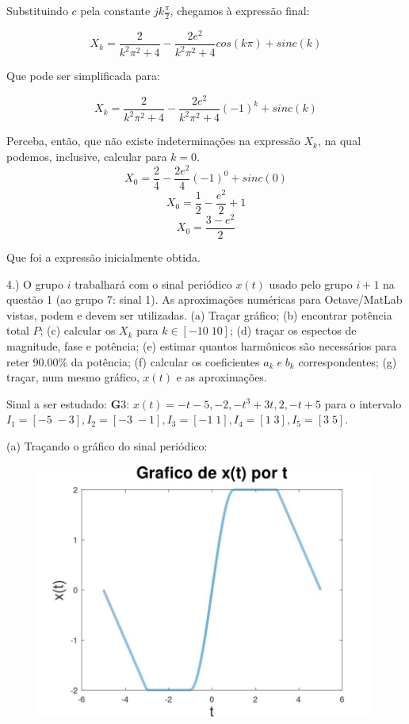 \documentclass{article}
\begin{document}
Substituindo $c$ pela constante $jk\frac{\pi}{2}$, chegamos à expressão final:

\[X_{k} = \frac{2}{k^2\pi^2 + 4} - \frac{2e^2}{k^2\pi^2 + 4}cos(k\pi) + sinc(k)\]

Que pode ser simplificada para:

\[X_{k} = \frac{2}{k^2\pi^2 + 4} - \frac{2e^2}{k^2\pi^2 + 4}(-1)^{k} + sinc(k)\]

Perceba, então, que não existe indeterminações na expressão $X_{k}$, na qual podemos, inclusive, calcular para $k = 0$.
\[X_{0} = \frac{2}{4} - \frac{2e^2}{4}(-1)^{0} + sinc(0)\]
\[X_{0} = \frac{1}{2} - \frac{e^2}{2} + 1\]
\[X_{0} = \frac{3 - e^2}{2}\]

Que foi a expressão inicialmente obtida.

\vspace{\baselineskip}

4.) O grupo $i$ trabalhará com o sinal periódico $x(t)$ usado pelo grupo $i + 1$ na questão 1 (ao grupo 7: sinal 1). As aproximações numéricas para Octave/MatLab vistas, podem e devem ser utilizadas.
(a) Traçar gráfico;
(b) encontrar potência total $P$;
(c) calcular os $X_{k}$ para $k \in [-10\;10]$;
(d) traçar os espectos de magnitude, fase e potência;
(e) estimar quantos harmônicos são necessários para reter $90.00\%$ da potência;
(f) calcular os coeficientes $a_{k}\;e\;b_{k}$ correspondentes;
(g) traçar, num mesmo gráfico, $x(t)$ e as aproximações.

Sinal a ser estudado: {\textbf G3}: $x(t) = -t - 5, -2, -t^3 + 3t, 2, -t + 5$ para o intervalo $I_{1} = [-5\;-3], I_{2} = [-3\;-1], I_{3} = [-1\;1], I_{4} = [1\;3], I_{5} = [3\;5]$.

\newpage

(a) Traçando o gráfico do sinal periódico:

\begin{figure}[!ht]
    \includegraphics[scale=0.3]{plot4a}
    \centering
\end{figure}
\end{document}
